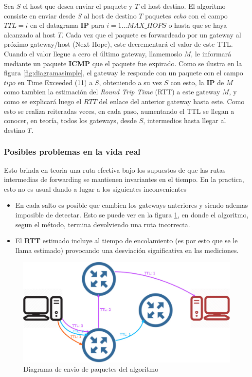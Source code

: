 Sea $S$ el host que desea enviar el paquete y $T$ el host destino.
El algoritmo consiste en enviar desde $S$ al host de destino $T$ paquetes
\emph{echo} con el campo $TTL=i$ en el datagrama \textbf{IP} para $i=1 \dots
MAX\_HOPS$ o hasta que se haya alcanzado al host $T$. Cada vez que el paquete
es forwardeado por un gateway al próximo gateway/host (Next Hope), este decrementará el
valor de este TTL. Cuando el valor llegue a cero el último gateway, llamemoslo
$M$, le informará mediante un paquete \textbf{ICMP} que el paquete fue expirado.
Como se ilustra en la figura \ref{fig:diagramasimple}, el gateway le responde con un paquete con el campo $tipo$ en
Time Exceeded (11) a $S$, obteniendo a su vez $S$ con esto, la \textbf{IP} de $M$ como
tambien la estimación del \textit{Round
Trip Time} (RTT) a este gateway $M$, y como se explicará luego el $RTT$ del enlace
del anterior gateway hasta este. Como esto se realiza reiteradas veces, en
cada paso, aumentando el TTL se llegan a conocer, en teoría, todos los
gateways, desde $S$, intermedios hasta llegar al destino $T$.

\subsubsection{Posibles problemas en la vida real}


Esto brinda en teoria una ruta efectiva bajo los supuestos de que
las rutas intermedias de forwarding se mantienen invariantes en el tiempo. En
la practica, esto no es usual dando a lugar a los siguientes inconvenientes

\begin{itemize}
	\item En cada salto es posible que cambien los gateways anteriores y siendo
	ademas imposible de detectar. Esto se puede ver en la figura \ref{fig:diagramareal},
	en donde el algoritmo, segun el método, termina devolviendo una ruta incorrecta.
	\item El \textbf{RTT} estimado incluye al tiempo de encolamiento (es por esto
	que se le llama estimado) provocando una desviación significativa en las
	mediciones.
\end{itemize}

\begin{figure}[ht]
	\begin{center}
		\includegraphics[width=0.8\columnwidth]{imagenes/diagrama_2.jpg}
		\caption{Diagrama de envio de paquetes del algoritmo}
		\label{fig:diagramareal}
	\end{center}
\end{figure}

